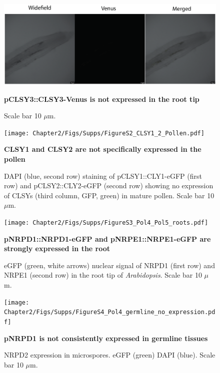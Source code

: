 
\begin{figure}[htbp!] 
\centering    
    \includegraphics[width=1\textwidth]{Chapter2/Figs/Supps/FigureS1_CLSY3_Root_tip_neg.pdf}
\caption{\textbf{pCLSY3::CLSY3-Venus is not expressed in the root tip}}
\label{fig:clsy3_root}
\captionsetup{font=small}
    \caption*{Scale bar 10 $\mu$m.}
\end{figure}

\begin{figure}[htbp!] 
\centering    
    \texttt{[image: Chapter2/Figs/Supps/FigureS2\_CLSY1\_2\_Pollen.pdf]}
\caption{\textbf{CLSY1 and CLSY2 are not specifically expressed in the pollen}}
\label{fig:clsy1_2_pollen}
\captionsetup{font=small}
    \caption*{DAPI (blue, second row) staining of pCLSY1::CLY1-eGFP (first row) and pCLSY2::CLY2-eGFP (second row) showing no expression of CLSYs (third column, GFP, green) in mature pollen. Scale bar 10 $\mu$m.}
\end{figure}

\begin{figure}[htbp!] 
\centering    
    \texttt{[image: Chapter2/Figs/Supps/FigureS3\_Pol4\_Pol5\_roots.pdf]}
\caption{\textbf{pNRPD1::NRPD1-eGFP and pNRPE1::NRPE1-eGFP are strongly expressed in the root}}
\label{fig:Pol4_5_roots}
\captionsetup{font=small}
    \caption*{eGFP (green, white arrows) nuclear signal of NRPD1 (first row) and NRPE1 (second row) in the root tip of \textit{Arabidopsis}. Scale bar 10 $\mu$m.}
\end{figure}

\begin{figure}[htbp!] 
\centering    
    \texttt{[image: Chapter2/Figs/Supps/FigureS4\_Pol4\_germline\_no\_expression.pdf]}
\caption{\textbf{pNRPD1 is not consistently expressed in germline tissues}}
\label{fig:Pol4_germ_no_expression}
\captionsetup{font=small}
    \caption*{NRPD2 expression in microspores. eGFP (green) DAPI (blue). Scale bar 10 $\mu$m.}
\end{figure}

